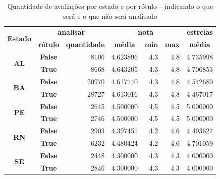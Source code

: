 \begin{table}[h]
	\centering
	\begin{tabular}{|c|crrrrr|}
		\hline
		\multicolumn{1}{|c|}{\multirow{2}{*}{\textbf{Estado}}} &
		\multicolumn{2}{c|}{\textbf{analisar}}                 &
		\multicolumn{3}{c|}{\textbf{nota}}                     &
		\multicolumn{1}{c|}{\textbf{estrelas}}                                                                            \\ \cline{2-7}
		\multicolumn{1}{|l|}{}                                 &
		\multicolumn{1}{c}{\textbf{rótulo}}                    &
		\multicolumn{1}{c|}{\textbf{quantidade}}               &
		\multicolumn{1}{c}{\textbf{média}}                     &
		\multicolumn{1}{c}{\textbf{min}}                       &
		\multicolumn{1}{c|}{\textbf{max}}                      &
		\multicolumn{1}{c|}{\textbf{média}}                                                                               \\ \hline
		\multirow{2}{*}{\textbf{AL}}                           & \textbf{False} & 8106  & 4.623896 & 4.3 & 4.8 & 4.735998 \\
		                                                       & \textbf{True}  & 8668  & 4.643205 & 4.3 & 4.8 & 4.706853 \\ \hline
		\multirow{2}{*}{\textbf{BA}}                           & \textbf{False} & 20970 & 4.617740 & 4.3 & 4.8 & 4.542680 \\
		                                                       & \textbf{True}  & 28727 & 4.613016 & 4.3 & 4.8 & 4.467017 \\ \hline
		\multirow{2}{*}{\textbf{PE}}                           & \textbf{False} & 2645  & 4.500000 & 4.5 & 4.5 & 5.000000 \\
		                                                       & \textbf{True}  & 2746  & 4.500000 & 4.5 & 4.5 & 5.000000 \\ \hline
		\multirow{2}{*}{\textbf{RN}}                           & \textbf{False} & 2903  & 4.397451 & 4.2 & 4.6 & 4.493627 \\
		                                                       & \textbf{True}  & 6232  & 4.480424 & 4.2 & 4.6 & 4.701059 \\ \hline
		\multirow{2}{*}{\textbf{SE}}                           & \textbf{False} & 2448  & 4.300000 & 4.3 & 4.3 & 4.000000 \\
		                                                       & \textbf{True}  & 2846  & 4.300000 & 4.3 & 4.3 & 4.000000 \\ \hline
	\end{tabular}\caption{Quantidade de avaliações por estado e por rótulo -- indicando o que será e o que não será analisado}
	\label{table:distribuicao_review_por_estado}
\end{table}

